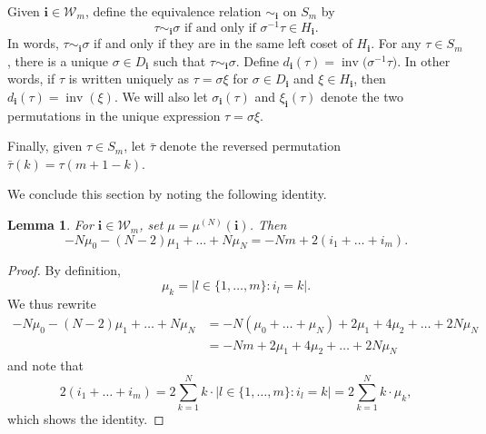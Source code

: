 \documentclass[pdftex]{sigma}
\numberwithin{equation}{section}
\newtheorem{Lemma}[Theorem]{Lemma}
\DeclareMathOperator{\inv}{inv}
\newcommand{\ii}{{\mathbf{i}}}
\begin{document}
Given $\ii \in \mathcal{W}_m$, define the equivalence relation $\sim_{\ii}$ on $S_m$ by
\[
\tau \sim_{\ii} \sigma \text{ if and only if } \sigma^{-1}\tau \in H_{\ii}.
\]
In words, $\tau \sim_{\ii} \sigma$ if and only if they are in the same left coset of $H_{\ii}$. For any $\tau \in S_m$, there is a unique $\sigma \in D_{\ii}$ such that $\tau \sim_{\ii} \sigma$. Define $d_{\ii}(\tau)= \inv\big(\sigma^{-1}\tau\big)$. In other words, if $\tau$ is written uniquely as $\tau=\sigma \xi$ for $\sigma \in D_{\ii}$ and $\xi \in H_{\ii}$, then $d_{\ii}(\tau) = \inv(\xi)$. We will also let $\sigma_{\ii}(\tau)$ and $\xi_{\ii}(\tau)$ denote the two permutations in the unique expression $\tau = \sigma \xi$.

Finally, given $\tau \in S_m$, let $\bar{\tau}$ denote the reversed permutation $\bar{\tau}(k)= \tau(m+1-k)$.

We conclude this section by noting the following identity.
\begin{Lemma}\label{Leem}
For $\ii \in \mathcal{W}_m$, set $\mu = \mu^{(N)}(\ii)$. Then
\[
-N\mu_{0} -(N-2)\mu_{1} + \dots + N\mu_{N} = -Nm + 2(i_1+ \dots + i_m).
\]
\end{Lemma}
\begin{proof}
By definition,
\[
\mu_k = | l \in \{1,\dots,m\}\colon i_l=k |.
\]
We thus rewrite
\begin{align*}
-N\mu_{0} -(N-2)\mu_{1} + \dots + N\mu_{N} &= -N(\mu_0 + \dots + \mu_N) + 2\mu_1 + 4\mu_2 + \dots + 2N\mu_N \\
&= -Nm+ 2\mu_1 + 4\mu_2 + \dots + 2N\mu_N
\end{align*}
and note that
\[
2(i_1 + \dots + i_m) = 2\sum_{k=1}^N k\cdot | l \in \{1,\dots,m\}\colon i_l=k | = 2\sum_{k=1}^N k\cdot \mu_k,
\]
which shows the identity.
\end{proof}
\end{document}
